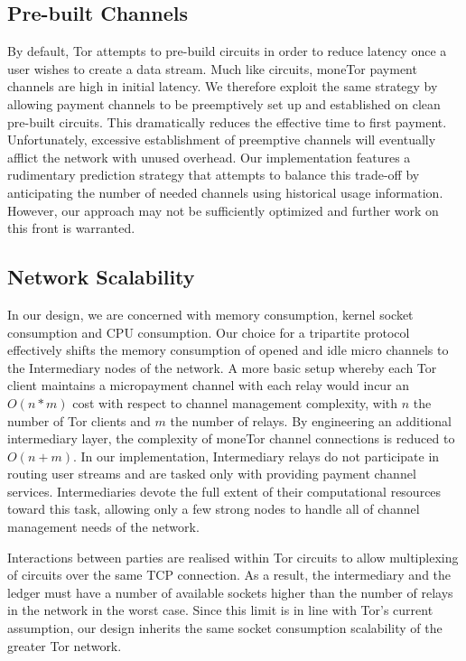 \subsection{Pre-built Channels}
By default, Tor attempts to pre-build circuits in order to reduce latency once a
user wishes to create a data stream. Much like circuits, moneTor payment
channels are high in initial latency. We therefore exploit the same strategy by
allowing payment channels to be preemptively set up and established on clean
pre-built circuits. This dramatically reduces the effective time to first
payment. Unfortunately, excessive establishment of preemptive channels will
eventually afflict the network with unused overhead. Our implementation features
a rudimentary prediction strategy that attempts to balance this trade-off by
anticipating the number of needed channels using historical usage
information. However, our approach may not be sufficiently optimized and further
work on this front is warranted.

\subsection{Network Scalability}
\label{subsub:scalability}

In our design, we are concerned with memory consumption, kernel socket
consumption and CPU consumption. Our choice for a tripartite protocol
effectively shifts the memory consumption of opened and idle micro
channels to the Intermediary nodes of the network. A more basic setup
whereby each Tor client maintains a micropayment channel with each
relay would incur an $O(n*m)$ cost with
respect to channel management complexity, with $n$ the number of Tor clients and $m$ the number of relays. By engineering an additional
intermediary layer, the complexity of moneTor channel connections is
reduced to $O(n+m)$. In our implementation, Intermediary relays do not
participate in routing user streams and are tasked only with providing
payment channel services. Intermediaries devote the full extent of
their computational resources toward this task, allowing only a few
strong nodes to handle all of channel management needs of the network.

Interactions between parties are realised within Tor circuits to allow
multiplexing of circuits over the same TCP connection. As a result, the
intermediary and the ledger must have a number of available sockets higher than
the number of relays in the network in the worst case. Since this limit is in
line with Tor's current assumption, our design inherits the same socket
consumption scalability of the greater Tor network.

